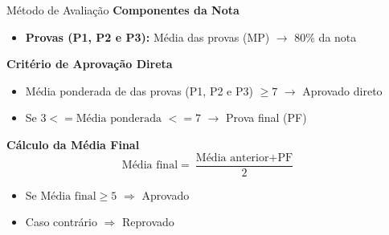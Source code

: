 \begin{frame}{Método de Avaliação}
    \textbf{Componentes da Nota}
    \begin{itemize}
        \item \textbf{Provas (P1, P2 e P3):}
              Média das provas (MP) $\rightarrow$ 80\% da nota

    \end{itemize}


    \textbf{Critério de Aprovação Direta}
    \begin{itemize}
        \item Média ponderada de das provas (P1, P2 e P3) $\geq 7$
              \hspace{1em} $\rightarrow$ Aprovado direto
        \item Se $3 <= \text{Média ponderada } <= 7$
              \hspace{1em} $\rightarrow$ Prova final (PF)
    \end{itemize}


    \textbf{Cálculo da Média Final}
    \[
        \text{Média final} = \frac{\text{Média anterior} + \text{PF}}{2}
    \]
    \begin{itemize}
        \item Se $\text{Média final} \geq 5$ $\Rightarrow$ Aprovado
        \item Caso contrário $\Rightarrow$ Reprovado
    \end{itemize}


\end{frame}


